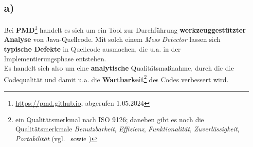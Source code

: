 \subsection*{a)}


Bei \textbf{PMD}\footnote{
    \url{https://pmd.github.io}, abgerufen 1.05.2024
} handelt es sich um ein Tool zur Durchführung \textbf{werkzeuggestützter Analyse} von Java-Quellcode.
Mit solch einem \textit{Mess Detector} lassen sich \textbf{typische Defekte} in Quellcode ausmachen, die u.a. in der Implementierungsphase entstehen.\\
Es handelt sich also um eine \textbf{analytische} Qualitätsmaßnahme, durch die die Codequalität und damit u.a. die \textbf{Wartbarkeit}\footnote{
ein Qualitätsmerkmal nach ISO 9126; daneben gibt es noch die Qualitätsmerkmale \textit{Benutzbarkeit}, \textit{Effizienz}, \textit{Funktionalität}, \textit{Zuverlässigkeit}, \textit{Portabilität} (vgl.~\cite[Abb. 1.2, 3]{Wed09c} sowie \cite[463 f.]{Bal08})
} des Codes verbessert wird.
